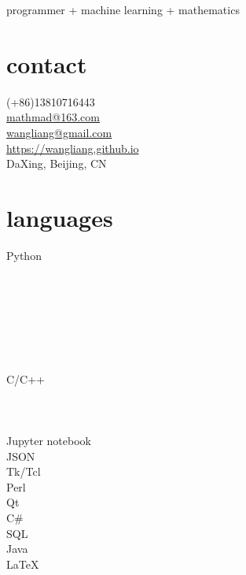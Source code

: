 \documentclass[letterpaper,10pt]{Resume_Liang}
\begin{document}
\thispagestyle{empty}
 {programmer + machine learning + mathematics}
\begin{aside}
  \section{contact}
    (+86)13810716443\\
    \href{mailto:mathmad@163.com}{mathmad@163.com}\\
    \href{mailto:wangliangster@gmail.com}{wangliang@gmail.com}\\
    \href{https://wangliangster.github.io}{https://wangliang.github.io}\\
    DaXing, Beijing, CN\\
   \vspace{\baselineskip}
  \section{languages}
    Python\\
    \\
    \\
    \\
    \\
    \\
    \\
    \\
    C/C++\\
    \\
    \\
    \\
    Jupyter notebook\\
    JSON\\
    Tk/Tcl\\
    Perl\\
    Qt\\
    C\#\\
    SQL\\
    Java\\
    \LaTeX \\
   \vspace{\baselineskip}

\end{aside}
\end{document}
